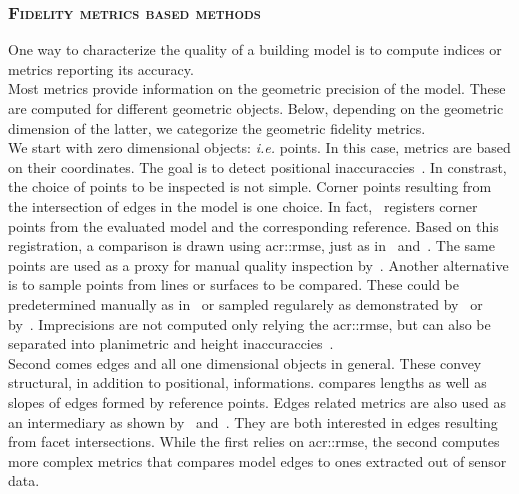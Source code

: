         \subsubsection{\textsc{Fidelity metrics based methods}}
            One way to characterize the quality of a building model is to compute indices or metrics reporting its accuracy.\\

            Most metrics provide information on the geometric precision of the model.
            These are computed for different geometric objects.
            Below, depending on the geometric dimension of the latter, we categorize the geometric fidelity metrics.\\

            We start with zero dimensional objects: \textit{i.e.} points.
            In this case, metrics are based on their coordinates.
            The goal is to detect positional inaccuraccies~\parencite{kaartinen2005accuracy}.
            In constrast, the choice of points to be inspected is not simple.
            Corner points resulting from the intersection of edges in the model is one choice.
            In fact,~\textcite{zeng2014multicriteria} registers corner points from the evaluated model and the corresponding reference.
            Based on this registration, a comparison is drawn using \gls{acr::rmse}, just as in~\parencite{landes2012quality} and~\parencite{you2011quality}.
            The same points are used as a proxy for manual quality inspection by~\textcite{elberink2011quality}.
            Another alternative is to sample points from lines or surfaces to be compared.
            These could be predetermined manually as in~\textcite{kaartinen2005accuracy} or sampled regularely as demonstrated by~\textcite{vogtle2003quality} or by~\textcite{tran2019geometric}.
            Imprecisions are not computed only relying the \gls{acr::rmse}, but can also be separated into planimetric and height inaccuraccies~\parencite{vogtle2003quality, kaartinen2005accuracy, jaynes2003recognition}.\\

            Second comes edges and all one dimensional objects in general.
            These convey structural, in addition to positional, informations.
            \textcite{kaartinen2005accuracy} compares lengths as well as slopes of edges formed by reference points.
            Edges related metrics are also used as an intermediary as shown by~\textcite{elberink2011quality} and~\textcite{michelin2013quality}.
            They are both interested in edges resulting from facet intersections.
            While the first relies on \gls{acr::rmse}, the second computes more complex metrics that compares model edges to ones extracted out of sensor data.\\

